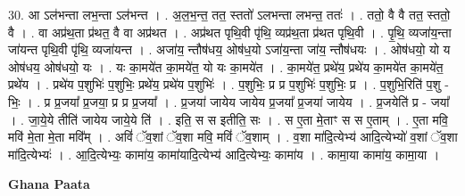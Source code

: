\documentclass[17pt]{extarticle}
\begin{document}
30. आ ऽल॑भन्ता लभ॒न्ता ऽल॑भन्त । . अ॒ल॒भ॒न्त॒ तत॒ स्ततो॑ ऽलभन्ता लभन्त॒ ततः॑ । . ततो॒ वै वै तत॒ स्ततो॒ वै । . वा अप्र॑थ॒ता प्र॑थत॒ वै वा अप्र॑थत । . अप्र॑थत पृथि॒वी पृ॑थि॒ व्यप्र॑थ॒ता प्र॑थत पृथि॒वी । . पृ॒थि॒ व्यजा॑य॒न्ता जा॑यन्त पृथि॒वी पृ॑थि॒ व्यजा॑यन्त । . अजा॑य॒ न्तौष॑धय॒ ओष॑ध॒यो ऽजा॑य॒न्ता जा॑य॒ न्तौष॑धयः । . ओष॑धयो॒ यो य ओष॑धय॒ ओष॑धयो॒ यः । . यः का॒मये॑त का॒मये॑त॒ यो यः का॒मये॑त । . का॒मये॑त॒ प्रथे॑य॒ प्रथे॑य का॒मये॑त का॒मये॑त॒ प्रथे॑य । . प्रथे॑य प॒शुभिः॑ प॒शुभिः॒ प्रथे॑य॒ प्रथे॑य प॒शुभिः॑ । . प॒शुभिः॒ प्र प्र प॒शुभिः॑ प॒शुभिः॒ प्र । . प॒शुभि॒रिति॑ प॒शु - भिः॒ । . प्र प्र॒जया᳚ प्र॒जया॒ प्र प्र प्र॒जया᳚ । . प्र॒जया॑ जायेय जायेय प्र॒जया᳚ प्र॒जया॑ जायेय । . प्र॒जयेति॑ प्र - जया᳚ । . जा॒ये॒ये तीति॑ जायेय जाये॒ये ति॑ । . इति॒ स स इतीति॒ सः । . स ए॒ता मे॒ताꣳ स स ए॒ताम् । . ए॒ता मवि॒ मवि॑ मे॒ता मे॒ता मवि᳚म् । . अविं॑ ॅव॒शां ॅव॒शा मवि॒ मविं॑ ॅव॒शाम् । . व॒शा मा॑दि॒त्येभ्य॑ आदि॒त्येभ्यो॑ व॒शां ॅव॒शा मा॑दि॒त्येभ्यः॑ । . आ॒दि॒त्येभ्यः॒ कामा॑य॒ कामा॑यादि॒त्येभ्य॑ आदि॒त्येभ्यः॒ कामा॑य । . कामा॒या कामा॑य॒ कामा॒या । \newline

\textbf{Ghana Paata } \newline
\end{document}
